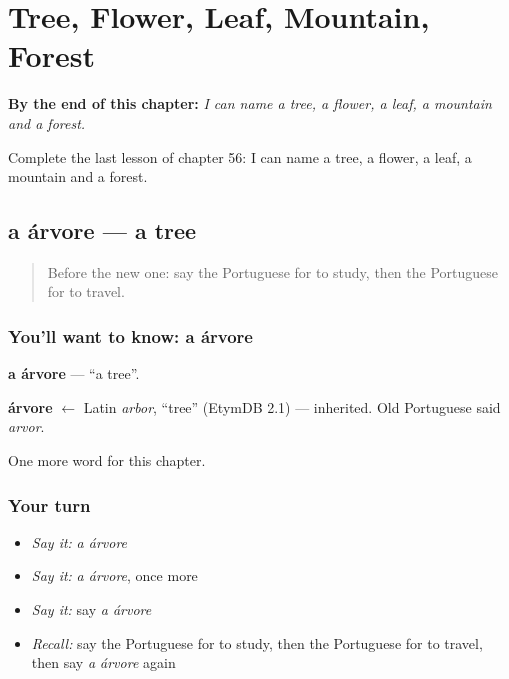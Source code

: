 
\chapter{Tree, Flower, Leaf, Mountain, Forest}
\label{ch:pt-tree-flower-leaf-mountain-forest}

\begin{chapteropening}
\textbf{By the end of this chapter:} \emph{I can name a tree, a flower, a leaf, a mountain and a forest.}

Complete the last lesson of chapter 56: I can name a tree, a flower, a leaf, a mountain and a forest.
\end{chapteropening}

\section[a árvore]{a árvore — a tree}

\label{lesson:PT-C56-arvore}



\begin{quote}
Before the new one: say the Portuguese for to study, then the Portuguese for to travel.
\end{quote}

\subsection*{You'll want to know: a árvore}
\textbf{a árvore} — \textquotedblleft{}a tree\textquotedblright{}.

\begin{cousinweb}
\textbf{árvore} $\leftarrow$ Latin \emph{arbor}, \textquotedblleft{}tree\textquotedblright{} (EtymDB 2.1) — inherited. Old Portuguese said \emph{arvor}.
\end{cousinweb}

\begin{grammarlens}[title={What you've built}]
One more word for this chapter.
\end{grammarlens}

\subsection*{Your turn}
\begin{itemize}
\raggedright
  \item \emph{Say it:} \emph{a árvore}
  \item \emph{Say it:} \emph{a árvore}, once more
  \item \emph{Say it:} say \emph{a árvore}
  \item \emph{Recall:} say the Portuguese for to study, then the Portuguese for to travel, then say \emph{a árvore} again
\end{itemize}

